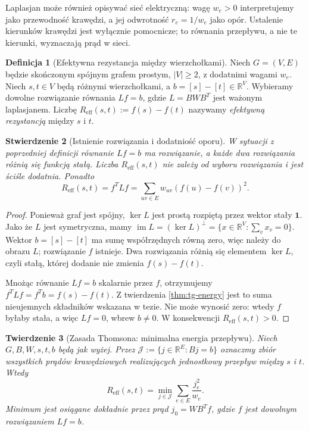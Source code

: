 \documentclass[11pt,a4paper]{report}
\numberwithin{equation}{section}
\theoremstyle{plain}
\newtheorem{twierdzenie}{Twierdzenie}[section]
\newtheorem{stwierdzenie}[twierdzenie]{Stwierdzenie}
\theoremstyle{definition}
\newtheorem{definicja}[twierdzenie]{Definicja}
\theoremstyle{remark}
\begin{document}
Laplasjan może również opisywać sieć elektryczną: wagę $w_e>0$
interpretujemy jako przewodność krawędzi, a jej odwrotność
$r_e=1/w_e$ jako opór. Ustalenie kierunków krawędzi jest wyłącznie
pomocnicze; to równania przepływu, a nie te kierunki, wyznaczają
prąd w sieci.

\begin{definicja}[Efektywna rezystancja między wierzchołkami]
Niech $G=(V,E)$ będzie skończonym spójnym grafem prostym,
$|V|\ge2$, z dodatnimi wagami $w_e$. Niech $s,t\in V$
będą różnymi wierzchołkami, a $b=[s]-[t]\in\mathbb R^V$.
Wybieramy dowolne rozwiązanie równania $Lf=b$,
gdzie $L=BWB^T$ jest ważonym laplasjanem.
Liczbę $R_{\mathrm{eff}}(s,t):=f(s)-f(t)$ nazywamy
\emph{efektywną rezystancją} między $s$ i $t$.
\end{definicja}

\begin{stwierdzenie}[Istnienie rozwiązania i dodatniość oporu]
W sytuacji z poprzedniej definicji równanie $Lf=b$ ma
rozwiązanie, a każde dwa rozwiązania różnią się funkcją stałą.
Liczba $R_{\mathrm{eff}}(s,t)$ nie zależy od wyboru rozwiązania
i jest ściśle dodatnia. Ponadto
\[
R_{\mathrm{eff}}(s,t)=f^TLf
   =\sum_{uv\in E}w_{uv}(f(u)-f(v))^2.
\]
\end{stwierdzenie}

\begin{proof}
Ponieważ graf jest spójny, $\ker L$ jest prostą
rozpiętą przez wektor stały $\mathbf1$. Jako że $L$
jest symetryczna, mamy
$\operatorname{im}L=(\ker L)^\perp
=\{x\in\mathbb R^V:\sum_vx_v=0\}$.
Wektor $b=[s]-[t]$ ma sumę współrzędnych równą zero,
więc należy do obrazu $L$; rozwiązanie $f$ istnieje.
Dwa rozwiązania różnią się elementem $\ker L$,
czyli stałą, której dodanie nie zmienia $f(s)-f(t)$.

Mnożąc równanie $Lf=b$ skalarnie przez $f$,
otrzymujemy $f^TLf=f^Tb=f(s)-f(t)$.
Z twierdzenia \ref{thm:tg-energy} jest to suma
nieujemnych składników wskazana w tezie.
Nie może wynosić zero: wtedy $f$ byłaby stała,
a więc $Lf=0$, wbrew $b\ne0$. W konsekwencji
$R_{\mathrm{eff}}(s,t)>0$.
\end{proof}

\begin{twierdzenie}[Zasada Thomsona: minimalna energia przepływu]
Niech $G,B,W,s,t,b$ będą jak wyżej. Przez
$\mathcal J:=\{j\in\mathbb R^E:Bj=b\}$ oznaczmy
zbiór wszystkich prądów krawędziowych realizujących
jednostkowy przepływ między $s$ i $t$.
Wtedy
\[
R_{\mathrm{eff}}(s,t)
=\min_{j\in\mathcal J}\sum_{e\in E}\frac{j_e^2}{w_e}.
\]
Minimum jest osiągane dokładnie przez prąd
$j_0=WB^Tf$, gdzie $f$ jest dowolnym rozwiązaniem $Lf=b$.
\end{twierdzenie}
\end{document}
